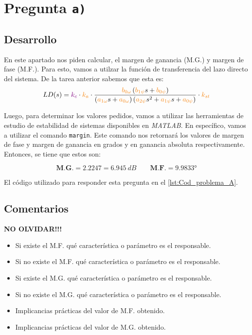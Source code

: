\section{Pregunta \texttt{a)}}\label{pregunta-a}

\subsection{Desarrollo}

En este apartado nos piden calcular, el margen de ganancia (M.G.) y margen de fase
(M.F.). Para esto, vamos a utilzar la función de transferencia del lazo directo del
sistema. De la tarea anterior \cite{tarea-2-sdc} sabemos que esta es:
\begin{equation}
  LD(s) = \mora{k_c} \cdot \nara{k_a} \cdot \frac{\nara{b_{0\omega}} \left(\nara{b_{1\psi}}s + \nara{b_{0\psi}}\right)}
  {\left(\nara{a_{1\omega}}s + \nara{a_{0\omega}}\right)\left(\nara{a_{2\psi}}s^2 + \nara{a_{1\psi}}s + \nara{a_{0\psi}}\right)} \cdot \nara{k_{st}}
\end{equation}

Luego, para determinar los valores pedidos, vamos a utilizar las herramientas
de estudio de estabilidad de sistemas disponibles en \textit{MATLAB}. En
específico, vamos a utilizar el comando \texttt{margin}. Este comando nos
retornará los valores de margen de fase y margen de ganancia en grados y en
ganancia absoluta respectivamente. Entonces, se tiene que estos son:

\begin{equation}
  \boxed{\textbf{M.G.} = 2.2247 = 6.945\ \unit{dB}} \qquad \boxed{\textbf{M.F.} = \ang{9.9833}}
\end{equation}

El código utilizado para responder esta pregunta en el \autoref{lst:Cod_problema_A}.

\subsection{Comentarios}
\textbf{NO OLVIDAR!!!}

\begin{itemize}
  \item Si existe el M.F. qué característica o parámetro es el responsable.
  \item Si no existe el M.F. qué característica o parámetro es el responsable.
  \item Si existe el M.G. qué característica o parámetro es el responsable.
  \item Si no existe el M.G. qué característica o parámetro es el responsable.
  \item Implicancias prácticas del valor de M.F. obtenido.
  \item Implicancias prácticas del valor de M.G. obtenido.
\end{itemize}



